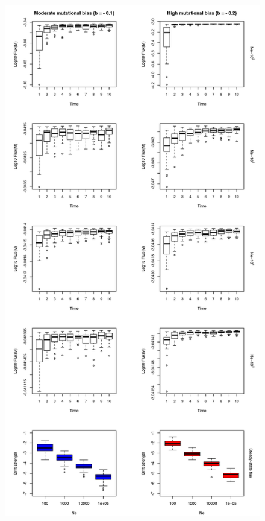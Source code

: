 \begin{figure}[H]
\vspace{-0.5cm}
\begin{center}
\includegraphics[scale=0.5,trim=0cm 0cm 0cm 0cm,clip]{pics/SM-Enzymes/Evo_SteadyState_ConcCrow_HighF.jpeg} 

\end{center}
\end{figure}
